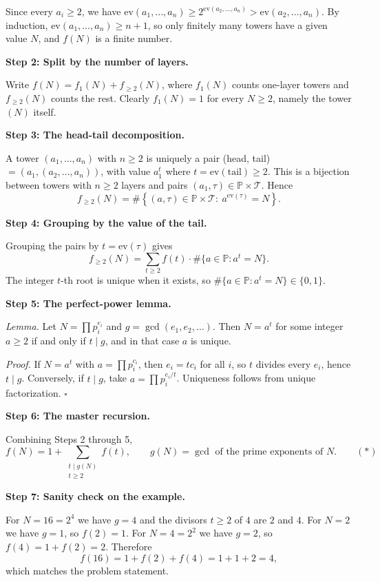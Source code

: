 \begin{enumerate}
 Since every $a_i\ge2$, we have $\mathrm{ev}(a_1,\dots,a_n)\ge 2^{\mathrm{ev}(a_2,\dots,a_n)}>\mathrm{ev}(a_2,\dots,a_n)$. By induction, $\mathrm{ev}(a_1,\dots,a_n)\ge n+1$, so only finitely many towers have a given value $N$, and $f(N)$ is a finite number.

 \textbf{Step 2: Split by the number of layers.}

 Write $f(N)=f_1(N)+f_{\ge2}(N)$, where $f_1(N)$ counts one-layer towers and $f_{\ge2}(N)$ counts the rest. Clearly $f_1(N)=1$ for every $N\ge2$, namely the tower $(N)$ itself.

 \textbf{Step 3: The head-tail decomposition.}

 A tower $(a_1,\dots,a_n)$ with $n\ge2$ is uniquely a pair (head, tail) $=(a_1,(a_2,\dots,a_n))$, with value $a_1^{t}$ where $t=\mathrm{ev}(\text{tail})\ge2$. This is a bijection between towers with $n\ge2$ layers and pairs $(a_1,\tau)\in\mathbb{P}\times\mathcal{T}$. Hence
 \[f_{\ge2}(N)=\#\left\{(a,\tau)\in\mathbb{P}\times\mathcal{T}:\ a^{\mathrm{ev}(\tau)}=N\right\}.\]

 \textbf{Step 4: Grouping by the value of the tail.}

 Grouping the pairs by $t=\mathrm{ev}(\tau)$ gives
 \[f_{\ge2}(N)=\sum_{t\ge2}f(t)\cdot\#\{a\in\mathbb{P}:a^t=N\}.\]The integer $t$-th root is unique when it exists, so $\#\{a\in\mathbb{P}:a^t=N\}\in\{0,1\}$.

 \textbf{Step 5: The perfect-power lemma.}

 \textit{Lemma.} Let $N=\prod p_i^{e_i}$ and $g=\gcd(e_1,e_2,\dots)$. Then $N=a^t$ for some integer $a\ge2$ if and only if $t\mid g$, and in that case $a$ is unique.

 \textit{Proof.} If $N=a^t$ with $a=\prod p_i^{c_i}$, then $e_i=tc_i$ for all $i$, so $t$ divides every $e_i$, hence $t\mid g$. Conversely, if $t\mid g$, take $a=\prod p_i^{e_i/t}$. Uniqueness follows from unique factorization. $\square$

 \textbf{Step 6: The master recursion.}

 Combining Steps 2 through 5,
 \[f(N)=1+\sum_{\substack{t\mid g(N)\\ t\ge2}}f(t),\qquad g(N)=\gcd\text{ of the prime exponents of }N.\qquad(\ast)\]

 \textbf{Step 7: Sanity check on the example.}

 For $N=16=2^4$ we have $g=4$ and the divisors $t\ge2$ of $4$ are $2$ and $4$. For $N=2$ we have $g=1$, so $f(2)=1$. For $N=4=2^2$ we have $g=2$, so $f(4)=1+f(2)=2$. Therefore
 \[f(16)=1+f(2)+f(4)=1+1+2=4,\]which matches the problem statement.


\end{enumerate}
